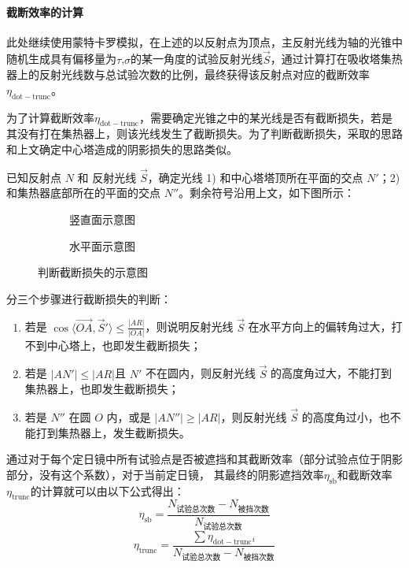 \documentclass[../main.tex]{subfiles}
\begin{document}
\paragraph{截断效率的计算} 此处继续使用蒙特卡罗模拟，在上述的以反射点为顶点，主反射光线为轴的光锥中随机生成具有偏移量为\(\tau\),\(\sigma\)的某一角度的试验反射光线\(\vec S\)，通过计算打在吸收塔集热器上的反射光线数与总试验次数的比例，最终获得该反射点对应的截断效率\(\eta _{\mathrm{dot}{-}\mathrm{trunc}}\)。

为了计算截断效率\(\eta _{\mathrm{dot-trunc}}\)，需要确定光锥之中的某光线是否有截断损失，若是其没有打在集热器上，则该光线发生了截断损失。为了判断截断损失，采取的思路和上文确定中心塔造成的阴影损失的思路类似。

已知反射点 \(N\) 和 反射光线 \(\vec S\)，确定光线 1) 和中心塔塔顶所在平面的交点 \(N'\)；2) 和集热器底部所在的平面的交点 \(N''\)。剩余符号沿用上文，如下图所示：
%
\begin{figure}[H]
\centering
\begin{subfigure}[b]{0.4\textwidth}
\centering

\caption{\kaishu 竖直面示意图}
\end{subfigure}
\begin{subfigure}[b]{0.4\textwidth}
\centering

\caption{\kaishu 水平面示意图}
\end{subfigure}
\caption{\kaishu 判断截断损失的示意图}
\end{figure}
%
分三个步骤进行截断损失的判断：
\begin{enumerate}
\item 若是 \( \displaystyle\cos \langle \overrightarrow{OA}, \vec S' \rangle\le \frac{\vert AR \vert}{\vert OA \vert}\)，则说明反射光线 \(\vec S\) 在水平方向上的偏转角过大，打不到中心塔上，也即发生截断损失；
\item 若是 \(\vert AN'\vert \le \vert AR \vert\)且 \(N'\) 不在圆内，则反射光线 \(\vec S\) 的高度角过大，不能打到集热器上，也即发生截断损失；
\item 若是 \(N''\) 在圆 \(O\) 内，或是 \(\vert AN'' \vert \ge \vert AR \vert\)，则反射光线 \(\vec S\) 的高度角过小，也不能打到集热器上，发生截断损失。
\end{enumerate}
通过对于每个定日镜中所有试验点是否被遮挡和其截断效率（部分试验点位于阴影部分，没有这个系数），对于当前定日镜，
其最终的阴影遮挡效率\(\eta _{\mathrm{s b}}\)和截断效率 \(\eta _{\mathrm{trunc}}\)的计算就可以由以下公式得出：
\begin{equation}
\eta _{\mathrm{s b}} = \frac{N_{\text{试验总次数}}- N_{\text{被挡次数}}}{N_{\text{试验总次数}}}
\end{equation}
\begin{equation}
\eta _{\mathrm{trunc}} =\frac{\sum\eta _{\mathrm{dot}{-}\mathrm{trunc}}{}_i}{N_{\text{试验总次数}}- N_{\text{被挡次数}}}
\end{equation}
\end{document}
